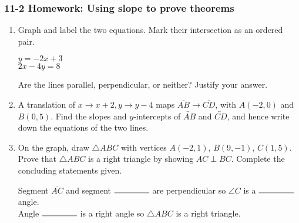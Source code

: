 \documentclass[12pt, twoside]{article}
\begin{document}
\subsubsection*{11-2 Homework: Using slope to prove theorems}
  \begin{enumerate}

\item Graph and label the two equations. Mark their intersection as an ordered pair.

  \begin{multicols}{2}
    $y = -2x+3$ \\
    $2x-4y = 8$
  \end{multicols}
  Are the lines parallel, perpendicular, or neither? Justify your answer.
  \vspace{1.5cm}

  \begin{center} %
  \end{center}


    \item A translation of $x \rightarrow x+2, y \rightarrow y-4$ maps $\overline{AB} \rightarrow \overline{CD}$, with $A(-2,0)$ and $B(0,5)$. Find the slopes and $y$-intercepts of $\overleftrightarrow{AB}$ and $\overleftrightarrow{CD}$, and hence write down the equations of the two lines.

\newpage

\item On the graph, draw $\triangle ABC$ with vertices $A(-2, 1)$, $B(9,-1)$, $C(1, 5)$. Prove that $\triangle ABC$ is a right triangle by showing $\overline{AC} \perp \overline{BC}$. Complete the concluding statements given.\\[1cm]
\vspace{8cm}

Segment $\overline{AC}$ and segment $\rule{1.5cm}{0.15mm}$ are perpendicular so $\angle C$ is a $\rule{1.5cm}{0.15mm}$ angle.\\[0.5cm]
Angle $\rule{1.5cm}{0.15mm}$ is a right angle so $\triangle ABC$ is a right triangle.


\end{enumerate}
\end{document}
